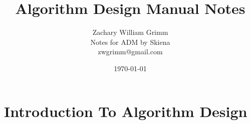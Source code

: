 \documentclass[10pt,letterpaper]{article}
\title{Algorithm Design Manual Notes}
\author{Zachary William Grimm\\
  \small{Notes  for ADM by Skiena}\\
  \small{zwgrimm@gmail.com}
}
\date{\today{}}
\begin{document}
\maketitle

\tableofcontents{}

\newpage{}
 

\section{Introduction To Algorithm Design}















% 
\end{document}
